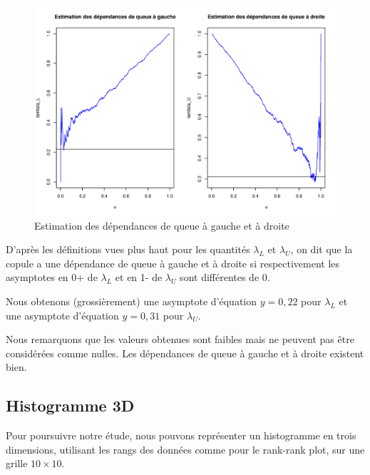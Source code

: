 \noindent%
\begin{figure}[H]
    \begin{center}
      \includegraphics[width=14 cm, angle=0]{./pictures/dependance_queue_empir.png}
      \centering\caption{Estimation des dépendances de queue à gauche et à droite}
    \end{center}
\end{figure}

D'après les définitions vues plus haut pour les quantités $\lambda_L$ et $\lambda_U$, on dit que la copule a une dépendance de queue à gauche
et à droite si respectivement les asymptotes en 0+ de $\lambda_L$ et en 1- de $\lambda_U$ sont différentes de 0.

Nous obtenons (grossièrement) une asymptote d'équation $y=0,22$ pour $\lambda_L$ et une asymptote d'équation $y=0,31$ pour $\lambda_U$.

Nous remarquons que les valeurs obtenues sont faibles mais ne peuvent pas être considérées comme nulles. Les dépendances de queue à gauche 
et à droite existent bien.


\subsection{Histogramme 3D}

Pour poursuivre notre étude, nous pouvons représenter un histogramme en trois dimensions, utilisant les rangs des données comme pour le rank-rank plot, sur une grille $10 \times 10$.

